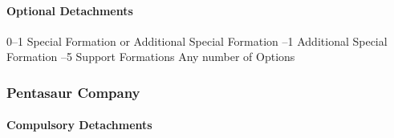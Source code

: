 \paragraph{Optional Detachments}

0--1 Special Formation or Additional Special Formation --1 Additional Special Formation --5 Support Formations \newline
Any number of Options

\subsubsection*{Pentasaur Company}

\paragraph{Compulsory Detachments}

